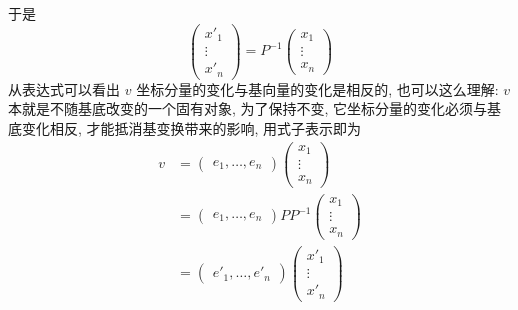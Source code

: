     于是
    \begin{equation*}
        \begin{pmatrix}
            {x'}_1 \\ \vdots \\ {x'}_n
        \end{pmatrix} = 
        P^{-1}
        \begin{pmatrix}
            x_1 \\ \vdots \\ x_n
        \end{pmatrix}
    \end{equation*}
    从表达式可以看出 $v$ 坐标分量的变化与基向量的变化是相反的, 也可以这么理解: $v$ 本就是不随基底改变的一个固有对象, 为了保持不变, 
    它坐标分量的变化必须与基底变化相反, 才能抵消基变换带来的影响, 用式子表示即为
    \begin{align*}
        v &= 
        \begin{pmatrix}
            e_1,\dots,e_n
        \end{pmatrix}
        \begin{pmatrix}
            x_1 \\ \vdots \\ x_n
        \end{pmatrix} \\ &= 
        \begin{pmatrix}
            e_1,\dots,e_n
        \end{pmatrix}PP^{-1}
        \begin{pmatrix}
            x_1 \\ \vdots \\ x_n
        \end{pmatrix} \\ &= 
        \begin{pmatrix}
            {e'}_1,\dots,{e'}_n
        \end{pmatrix}
        \begin{pmatrix}
            {x'}_1 \\ \vdots \\ {x'}_n
        \end{pmatrix}
    \end{align*}

